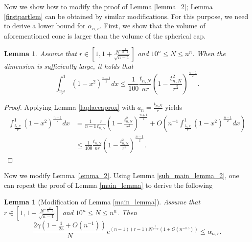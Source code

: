 \documentclass[10pt, twoside, leqno]{article}
\newtheorem{lemma}[thm]{Lemma}
\theoremstyle{definition}
\numberwithin{equation}{section}
\newcommand{\be}{\begin{equation}}
\newcommand{\ee}{\end{equation}}
\newcommand{\E}{{\mathbb{E}}}
\newcommand{\NN}{N^{-\frac 2{n-1} }}
\begin{document}
Now we show how to modify the proof of Lemma \ref{lemma_2}; Lemma \ref{firstpartlem} can be obtained by similar modifications.
For this purpose, we need to derive a lower bound for $ \alpha_{n,r}$.  First, we  show that the volume of aforementioned cone is larger than the volume of the spherical cap.
\begin{lemma}{\label{sub_main_lemma_2}}
	Assume that $ r \in [1, 1+\frac{\NN}{\sqrt{n-1}}]$ and $ 10^{n}\leq N\leq n^{n} $. When the dimension is sufficiently large,  it holds that
	\begin{equation*}
	\int_{\frac{t_{n,N}}{r}}^{1}\left(1-x^2\right)^{\frac{n-1}{2}}dx \leq \frac{1}{100}\frac {t_{n,N}}{nr} \left(1-\frac{t_{n,N}^2}{r^2}\right)^{\frac{n-1}{2}}.
	\end{equation*}
\end{lemma}
\begin{proof}
	Applying Lemma \ref{laplaceaprox} with $ a_n = \frac {t_{n,N}}r$ yields
\begin{align*}\int_{\frac{t_{n,N}}{r}}^{1}\left(1-x^{2}\right)^{\frac{n-1}{2}}dx & =\frac{1}{n-1}\frac{r}{t_{n,N}}\left(1-\frac{t_{n,N}^{2}}{r^{2}}\right)^{\frac{n+1}{2}}+O\left(n^{-1}\int_{\frac{t_{n,N}}{r}}^{1}\left(1-x^{2}\right)^{\frac{n-1}{2}}dx\right)\\
& \leq\frac{1}{100}\frac{t_{n,N}}{nr}\left(1-\frac{t_{n,N}^{2}}{r^{2}}\right)^{\frac{n-1}{2}}.
\end{align*}
\end{proof}
Now we modify Lemma \ref{lemma_2}.
Using  Lemma \ref{sub_main_lemma_2}, one can repeat the proof of Lemma \ref{main_lemma} to derive the following
\begin{lemma}[Modification of Lemma \ref{main_lemma}]{\label{alphnanrmodified}}
	Assume that $ r \in [1, 1+\frac{\NN}{\sqrt{n-1}}]$ and $ 10^{n}\leq N\leq n^{n} $. Then 
	\begin{equation*}
	\frac{2\gamma\left(1-\frac{1}{25}+ O\left(n^{-1}\right)\right)}{N}e^{\left(n-1\right)\left(r-1\right)N^{\frac{2}{n-1}}\left(1+O\left(n^{-0.5}\right)\right)}\leq\alpha_{n,r}.
	\end{equation*}
\end{lemma}
\end{document}

